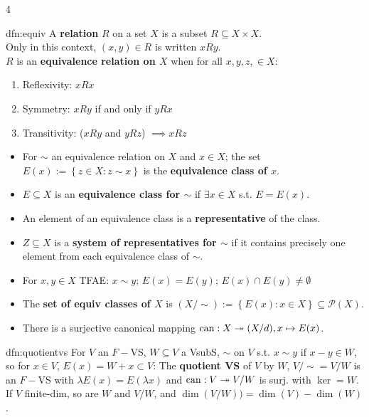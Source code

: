 \documentclass[landscape, 8pt]{extarticle}
\begin{document}
\begin{multicols*}{4}
		
		\begin{dfn}{dfn:equiv}{ }
			A \textbf{relation} $R$ on a set $X$ is a subset $R \subseteq X \times X$. \\
			Only in this context, $(x, y) \in R$ is written $xRy$.\\
			$R$ is an \textbf{equivalence relation on $X$} when for all $x, y, z, \in X$:
			\begin{enumerate}[label=(\roman*)]
				\item Reflexivity: $xRx$
				\item Symmetry: $xRy$ if and only if $yRx$
				\item Transitivity: ($xRy$ and $yRz$) $\implies xRz$
			\end{enumerate}
			\begin{itemize}
			\item[*] For $\sim$ an equivalence relation on $X$ and $x \in X$; the set $E(x) := \left\{z \in X : z \sim x\right\}$ is the \textbf{equivalence class of $x$}.
			\item $E \subseteq X$ is an \textbf{equivalence class for $\sim$} if $\exists x \in X$ s.t. $E = E(x)$.
			\item  An element of an equivalence class is a \textbf{representative} of the class. 
			\item $Z \subseteq X$ is a \textbf{system of representatives for $\sim$} if it contains precisely one element from each equivalence class of $\sim$. 
			\item For $x, y \in X$ TFAE: $x \sim y$; $E(x) = E(y)$; $E(x) \cap E(y) \ne \emptyset$
			\item[*] The \textbf{set of equiv classes of $X$} is $(X/\sim) := \left\{E(x) : x \in X\right\} \subseteq \mathcal{P}(X)$.
			\item There is a surjective canonical mapping $\operatorname{can}: X \twoheadrightarrow (X/d), x \mapsto E(x)$.
			\end{itemize}			
			
		\end{dfn}
		
		
		\begin{dfn}{dfn:quotientvs}{ }
			For $V$ an $F-$VS, $W \subseteq V$ a VsubS, $\sim$ on $V$ s.t. $x \sim y$ if $x-y\in W$, so for $x\in V$, $E(x) = W + x \subset V$: The \textbf{quotient VS} of $V$ by $W$, $V/\sim = V/W$ is an $F-$VS with $\lambda E(x) = E(\lambda x)$ and $\operatorname{can}: V \twoheadrightarrow V/W$ is surj. with $\ker = W$. If $V$ finite-dim, so are $W$ and $V/W$, and $\dim(V/W)) = \dim(V) - \dim (W)$.
			

\end{dfn}
\end{multicols*}
\end{document}
